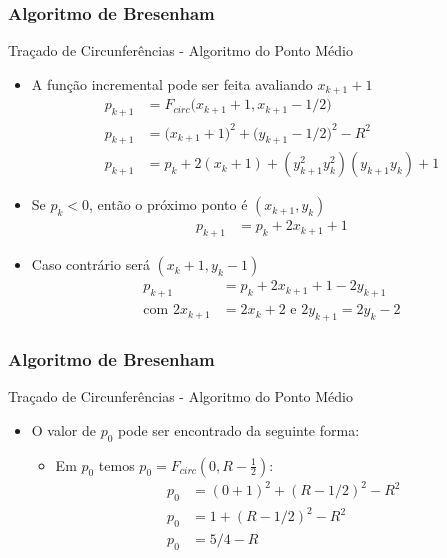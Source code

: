 \documentclass{beamer}
\begin{document}
\begin{frame}
\frametitle{Algoritmo de Bresenham}
		\begin{block}{Traçado de Circunferências - Algoritmo do Ponto Médio}
		\begin{itemize}
			\item A função incremental pode ser feita avaliando $x_{k+1}+1$
			\begin{align*}
				p_{k+1} &= F_{circ}\big(x_{k+1}+1,x_{k+1}-1/2\big)\\
				p_{k+1} &= \big(x_{k+1}+1)^2+\big(y_{k+1}-1/2\big)^2 - R^2\\
				p_{k+1} &= p_k +2(x_k+1) + (y_{k+1}^2 y_{k}^2)(y_{k+1}y_k)+1
			\end{align*}
		\item Se $p_k<0$, então o próximo ponto é $(x_{k+1},y_k)$
			\begin{align*}
				p_{k+1} &= p_k + 2x_{k+1}+1
			\end{align*}
		\item Caso contrário será $(x_k+1,y_k-1)$
			\begin{align*}
				p_{k+1} &= p_k + 2x_{k+1}+ 1 - 2y_{k+1}\\
				\text{com } 2x_{k+1} &= 2x_{k}+2 \text{ e }2y_{k+1} = 2y_{k}-2
			\end{align*}
		\end{itemize}
	\end{block}

\end{frame}


\begin{frame}
\frametitle{Algoritmo de Bresenham}
		\begin{block}{Traçado de Circunferências - Algoritmo do Ponto Médio}
		\begin{itemize}
			\item O valor de $p_0$ pode ser encontrado da seguinte forma:
				\begin{itemize}
					\item Em $p_0$ temos $p_0 = F_{circ}(0,R-\frac{1}{2})$:
						\begin{align*}
							p_0 &= (0+1)^2 + (R-1/2)^2 - R^2\\
							p_0 &= 1 + (R-1/2)^2 - R^2\\
							p_0 &= 5/4-R
						\end{align*}
				\end{itemize}
			
		\end{itemize}
	\end{block}

\end{frame}
\end{document}
